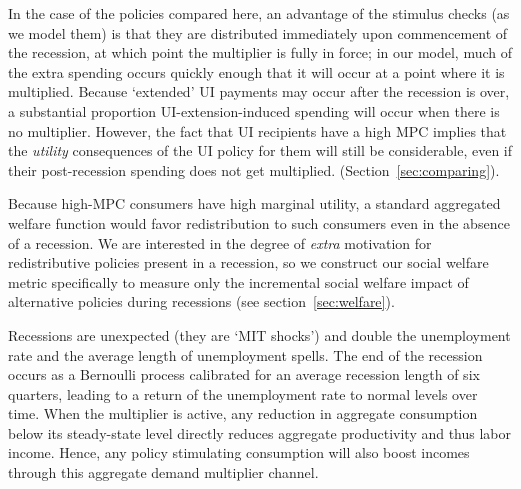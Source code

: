 \documentclass[../HAFiscal]{subfiles}
\begin{document}
In the case of the policies compared here, an advantage of the stimulus checks (as we model them) is that they are distributed immediately upon commencement of the recession, at which point the multiplier is fully in force; in our model, much of the extra spending occurs quickly enough that it will occur at a point where it is multiplied.  Because `extended' UI payments may occur after the recession is over, a substantial proportion UI-extension-induced spending will occur when there is no multiplier.  However, the fact that UI recipients have a high MPC implies that the \textit{utility} consequences of the UI policy for them will still be considerable, even if their post-recession spending does not get multiplied.  (Section~\ref{sec:comparing}).

Because high-MPC consumers have high marginal utility, a standard aggregated welfare function would favor redistribution to such consumers even in the absence of a recession. We are interested in the degree of \textit{extra} motivation for redistributive policies present in a recession, so we construct our social welfare metric specifically to measure only the incremental social welfare impact of alternative policies during recessions (see section~\ref{sec:welfare}).


Recessions are unexpected (they are `MIT shocks') and double the unemployment rate and the average length of unemployment spells. The end of the recession occurs as a Bernoulli process calibrated for an average recession length of six quarters, leading to a return of the unemployment rate to normal levels over time. When the multiplier is active, any reduction in aggregate consumption below its steady-state level directly reduces aggregate productivity and thus labor income. Hence, any policy stimulating consumption will also boost incomes through this aggregate demand multiplier channel.

\end{document}
